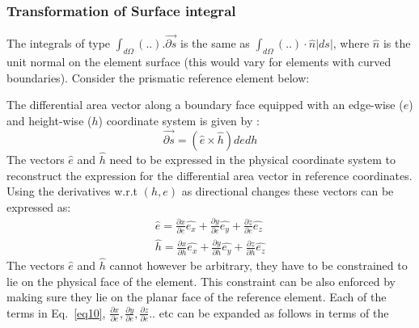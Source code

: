 \documentclass[11pt]{article}
\begin{document}
\subsubsection{Transformation of Surface integral}
The integrals of type $\int_{d\Omega} (..).\vec{\partial s}$ is the same as $\int_{d\Omega} (..) \cdot \hat{n} |ds|$, where $\hat{n}$ is the unit normal on the element surface (this would vary for
elements with curved boundaries). Consider the prismatic reference element below:
\newline
{}
\newline
The differential area vector along a boundary face equipped with an edge-wise ($e$) and
height-wise ($h$) coordinate system is given by :
\begin{equation}
  \vec{\partial s} = (\hat{e} \times \hat{h}) de dh
\end{equation}
The vectors $\hat{e}$ and $\hat{h}$ need to be expressed in the physical coordinate
system to reconstruct the expression for the differential area vector
in reference coordinates. Using the derivatives w.r.t $(h,e)$ as directional changes these
vectors can be expressed as:
\begin{eqnarray}
  \hat{e} = \frac{\partial x}{\partial e} \hat{e_x} + \frac{\partial y}{\partial e} \hat{e_y} + \frac{\partial z}{\partial e} \hat{e_z} \\
  \hat{h} = \frac{\partial x}{\partial h} \hat{e_x} + \frac{\partial y}{\partial h} \hat{e_y} + \frac{\partial z}{\partial h} \hat{e_z}
  \label{eq10}
\end{eqnarray}
The vectors $\hat{e}$ and $\hat{h}$ cannot however be arbitrary, they have to be constrained to
lie on the physical face of the element. This constraint can be also enforced by making sure they
lie on the planar face of the reference element. Each of the terms in Eq.~\ref{eq10},
$\frac{\partial x}{\partial e},\frac{\partial y}{\partial e},\frac{\partial z}{\partial e}..$ etc can be expanded as follows in terms of the
\end{document}
